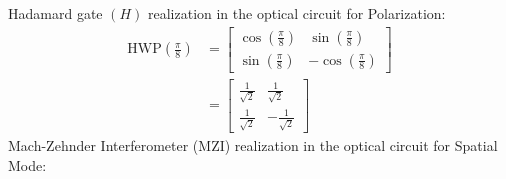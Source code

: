 \documentclass{article}
\begin{document}
Hadamard gate \((H)\) realization in the optical circuit for Polarization:
\begin{align*}
	\text{HWP}(\frac{\pi}{8}) &= \begin{bmatrix}
		\cos(\frac{\pi}{8}) & \sin(\frac{\pi}{8})  \\
		\sin(\frac{\pi}{8}) & -\cos(\frac{\pi}{8})
	\end{bmatrix} \\[2ex]
	&= \begin{bmatrix}
		\frac{1}{\sqrt{2}} & \frac{1}{\sqrt{2}}  \\
		\frac{1}{\sqrt{2}} & -\frac{1}{\sqrt{2}}
	\end{bmatrix}
\end{align*}
Mach-Zehnder Interferometer (MZI) realization in the optical circuit for Spatial Mode:
\end{document}
